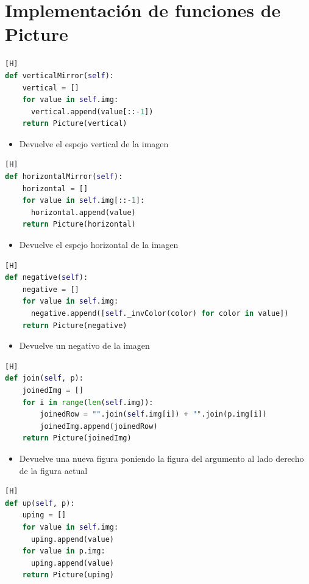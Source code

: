 \documentclass{article}
\begin{document}
\section{Implementación de funciones de Picture}
	\begin{lstlisting}[language=Python,caption={Función verticalMirror(self)}][H]
def verticalMirror(self):
    vertical = []
    for value in self.img:
      vertical.append(value[::-1])
    return Picture(vertical)
	\end{lstlisting}
	\begin{itemize}
		\item Devuelve el espejo vertical de la imagen 
	\end{itemize}
	\begin{lstlisting}[language=Python,caption={Función horizontalMirror(self)}][H]
def horizontalMirror(self):
    horizontal = []
    for value in self.img[::-1]:
      horizontal.append(value)
    return Picture(horizontal)
	\end{lstlisting}
	\begin{itemize}
		\item Devuelve el espejo horizontal de la imagen
	\end{itemize}
	\begin{lstlisting}[language=Python,caption={Función negative(self)}][H]
def negative(self):
    negative = []
    for value in self.img:
      negative.append([self._invColor(color) for color in value])
    return Picture(negative)
	\end{lstlisting}
	\begin{itemize}
		\item Devuelve un negativo de la imagen 
	\end{itemize}
	\begin{lstlisting}[language=Python,caption={Función join(self, p)}][H]
def join(self, p):
    joinedImg = []
    for i in range(len(self.img)):
        joinedRow = "".join(self.img[i]) + "".join(p.img[i])
        joinedImg.append(joinedRow)
    return Picture(joinedImg)
	\end{lstlisting}
	\begin{itemize}
		\item Devuelve una nueva figura poniendo la figura del argumento al lado derecho de la figura actual
	\end{itemize}
	\begin{lstlisting}[language=Python,caption={Función up(self, p)}][H]
def up(self, p):
    uping = []
    for value in self.img:
      uping.append(value)
    for value in p.img:
      uping.append(value)
    return Picture(uping)
	\end{lstlisting}
\end{document}
